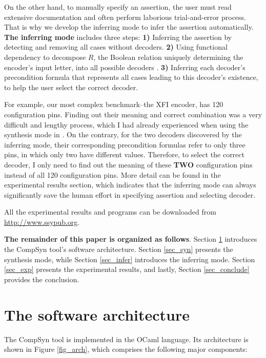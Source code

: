 \documentclass[runningheads,a4paper]{llncs}
\begin{document}
On the other hand,
to manually specify an assertion,
the user must read extensive documentation and often perform laborious trial-and-error process.
That is why we develop the inferring mode to infer the assertion automatically.
\textbf{The inferring mode} includes three steps:
\textbf{1)} Inferring the assertion \cite{ShengYuShen:iccad11} by detecting and removing all cases without decoders.
\textbf{2)} Using functional dependency \cite{funcdep} to decompose $R$,
the Boolean relation uniquely determining the encoder's input letter,
into all possible decoders \cite{ShengYuShen:tcad12}.
\textbf{3)} Inferring each decoder's precondition formula \cite{ShengYuShen:tcad12} that represents all cases leading to this decoder's existence,
to help the user select the correct decoder.

For example,
our most complex benchmark--the XFI encoder,
has 120 configuration pins.
Finding out their meaning and correct combination was a very difficult and lengthy process,
which I had already experienced when using the synthesis mode in \cite{ShengYuShen:iccad09}.
On the contrary,
for the two decoders discovered by the inferring mode,
their corresponding precondition formulas refer to only three pins,
in which only two have different values.
Therefore,
to select the correct decoder,
I only need to find out the meaning of these \textbf{TWO} configuration pins instead of all 120 configuration pins.
More detail can be found in the experimental results section,
which indicates that the inferring mode can always significantly save the human effort in specifying assertion and selecting decoder.

All the experimental results and programs can be downloaded from \url{http://www.ssypub.org}.

\textbf{The remainder of this paper is organized as follows}.
Section \ref{sec_arch} introduces the CompSyn tool's software architecture.
Section \ref{sec_syn} presents the synthesis mode,
while Section \ref{sec_infer} introduces the inferring mode.
Section \ref{sec_exp} presents the experimental results,
and lastly,
Section \ref{sec_conclude} provides the conclusion.

\section{The software architecture}\label{sec_arch}
The CompSyn tool is implemented in the OCaml language.
Its architecture is shown in Figure \ref{fig_arch},
which comprises the following major components:
\end{document}
